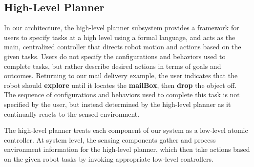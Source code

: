 \documentclass[journal]{IEEEtran}
\begin{document}

\subsection{High-Level Planner}
\label{sec:high-level}
In our architecture, the high-level planner subsystem provides a framework for users to specify tasks  at a high level using a formal language, and acts as the main, centralized controller that directs robot motion and actions based on the given tasks.  Users do not specify the configurations and behaviors used to complete tasks, but rather describe desired actions in terms of goals and outcomes.  Returning to our mail delivery example, the user indicates that the robot should \textbf{explore} until it locates the \textbf{mailBox}, then \textbf{drop} the object off.  The sequence of configurations and behaviors used to complete this task is not specified by the user, but instead determined by the high-level planner as it continually reacts to the sensed environment.

The high-level planner treats each component of our system as a low-level atomic controller.
At system level, the sensing components gather and process environment information for the high-level planner, which then take actions based on the given robot tasks by invoking appropriate low-level controllers.
\end{document}
